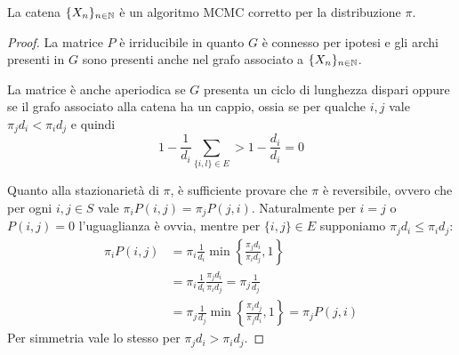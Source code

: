 \begin{thm}
	La catena $\{X_n\}_{n\in\mathbb N}$ è un algoritmo MCMC corretto per la distribuzione $\pi$.
\end{thm}
\begin{proof}
	La matrice $P$ è irriducibile in quanto $G$ è connesso per ipotesi e gli archi presenti in $G$ sono presenti anche nel grafo associato a $\{X_n\}_{n\in\mathbb N}$.

	La matrice è anche aperiodica se $G$ presenta un ciclo di lunghezza dispari oppure se il grafo associato alla catena ha un cappio, ossia se per qualche $i,j$ vale $\pi_j d_i<\pi_i d_j$ e quindi
	\begin{equation*}
		1 - \frac{1}{d_i} \sum_{\{i,l\}\in E} > 1 - \frac{d_i}{d_i} = 0
	\end{equation*}

	Quanto alla stazionarietà di $\pi$, è sufficiente provare che $\pi$ è reversibile, ovvero che per ogni $i,j\in S$ vale $\pi_i P(i,j)=\pi_j P(j,i)$. Naturalmente per $i=j$ o $P(i,j)=0$ l'uguaglianza è ovvia, mentre per $\{i,j\}\in E$ supponiamo $\pi_j d_i \le \pi_i d_j$:
	\begin{align*}
		\pi_i P(i,j) & = \pi_i \frac{1}{d_i} \min\left\{\frac{\pi_j d_i}{\pi_i d_j},1\right\}                         \\[1ex]
		             & = \pi_i \frac{1}{d_i} \frac{\pi_j d_i}{\pi_i d_j} = \pi_j \frac{1}{d_j}                        \\[1ex]
		             & = \pi_j \frac{1}{d_j} \min\left\{\frac{\pi_i d_j}{\pi_j d_i},1\right\} = \pi_j P(j,i)
	\end{align*}
	Per simmetria vale lo stesso per $\pi_j d_i > \pi_i d_j$.
\end{proof}

